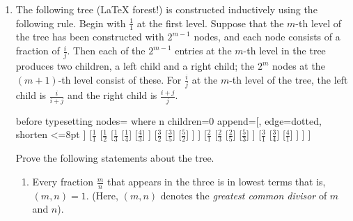\documentclass[11pt, leqno]{article}
\begin{document}
\begin{enumerate}
\begin{proof}
	Now our argument becomes somewhat recursive. Look at the entire sequence $\{x_i\}$ such that $i > j$. That is, the entire sequence of $\{x_i\}$ after $x_j$. Now we can repeat the same logic, either there is a maximum of the new sequence or there is not. If there exists no maximum, then b \textit{Case I} we have a monotonically increasing subsequence. If there is a maximum we continue to repeat. If there is always a maximum, what we get is a sequence of maximums we denote $\{m_1, m_2,...,m_j\}$. However, we know that each maximum must be less than or equal to the previous by the definition of max. Therefore, this sequence of maximums is monotonically decreasing. Hence, we have found a monotonic subsequence of $\{x_i\}$, showing that a sequence of real numbers $\{x_i\}$ will \textit{always} have a monotone subsequence.
	\end{proof}
	
	\item
	
	The following tree (LaTeX forest!) is constructed inductively using the following rule. Begin with $\frac{1}{1}$ at the first level. Suppose that the $m$-th level of the tree has been constructed with $2^{m-1}$ nodes, and each node consists of a fraction of $\frac{i}{j}$. Then each of the $2^{m-1}$ entries at the $m$-th level in the tree produces two children, a left child and a right child; the $2^m$ nodes at the $(m+1)$-th level consist of these. For $\frac{i}{j}$ at the $m$-th level of the tree, the left child is $\frac{i}{i+j}$ and the right child is $\frac{i+j}{j}$.
	
	\begin{center}
		\begin{forest}
		before typesetting nodes={
   			where n children=0{%
      			append={[, edge={dotted, shorten <=8pt} ]}
   		 }{}
  		}
		[$\frac{1}{1}$
			[$\frac{1}{2}$
				[$\frac{1}{3}$
					[$\frac{1}{4}$]
					[$\frac{4}{3}$]
				]
				[$\frac{3}{2}$
					[$\frac{3}{5}$]
					[$\frac{5}{2}$]
				]
			]
		[$\frac{2}{1}$
				[$\frac{2}{3}$
					[$\frac{2}{5}$]
					[$\frac{5}{3}$]
				]
				[$\frac{3}{1}$
					[$\frac{3}{4}$]
					[$\frac{4}{1}$]
				]
			]
		]
	\end{forest}
	\end{center}
	
	\vspace{5pc}
	
	Prove the following statements about the tree.
	
	\begin{enumerate}[label=(\alph*)]
		\item Every fraction $\frac{m}{n}$ that appears in the three is in lowest terms that is, $(m, n) = 1$. (Here, $(m, n)$ denotes the \textit{greatest common divisor} of $m$ and $n$).
		

\end{enumerate}
\end{enumerate}
\end{document}
